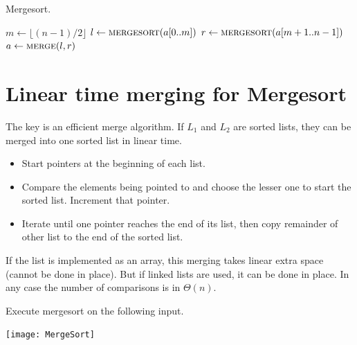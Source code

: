 \begin{algorithm}[H]
  \caption{Mergesort.}
    \label{alg:mergesort}
\begin{algorithmic}[0]
\State $m \gets \lfloor (n-1)/2 \rfloor$ 
\State $l \gets \Call{mergesort}{a[0..m]}$ 
\State $r \gets  \Call{mergesort}{a[m+1..n-1]}$ 
\State $a \gets  \Call{merge}{l, r}$ 
\EndIf
\State {}
\EndFunction  
\end{algorithmic}
\end{algorithm}

\section{Linear time merging for Mergesort}
The key is an efficient merge algorithm. 
If $L_1$ and $L_2$ are sorted lists, they can be merged into one sorted 
list in linear time.
\begin{itemize}
  \item Start pointers at the beginning of each list. 
  \item Compare the elements being pointed to 
  and choose the lesser one to start the sorted list. Increment that pointer. 
  \item Iterate until one pointer reaches the end of its list, 
  then copy remainder of other list to the end of the sorted list.
\end{itemize} 
If the list is implemented as an array, this merging takes linear extra 
space (cannot be done in place). But if linked lists are used, it can be done in 
place. In any case the number of comparisons is in $\Theta(n)$.


\begin{Boxample}[0]
Execute mergesort on the following input.
\begin{center}
\texttt{[image: MergeSort]} 
\end{center}
\end{Boxample}


